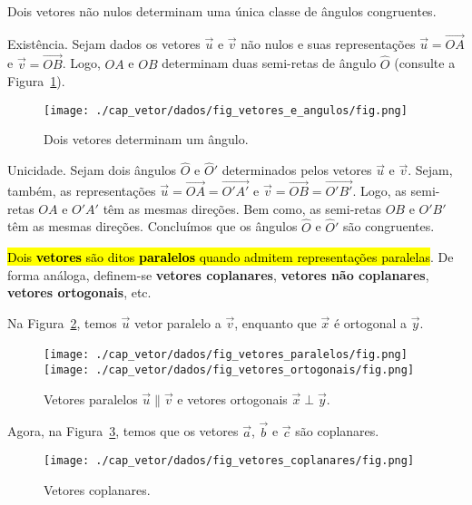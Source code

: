\begin{proposicao}
  Dois vetores não nulos determinam uma única classe de ângulos congruentes.
\end{proposicao}
\begin{demonstracao}
  Existência. Sejam dados os vetores $\vec{u}$ e $\vec{v}$ não nulos e suas representações $\vec{u}=\overrightarrow{OA}$ e $\vec{v}=\overrightarrow{OB}$. Logo, $OA$ e $OB$ determinam duas semi-retas de ângulo $\hat{O}$ (consulte a Figura~\ref{cap_vetor_sec_vetor:fig:vetores_e_angulos}).

  \begin{figure}[h!]
    \centering
    \texttt{[image: ./cap\_vetor/dados/fig\_vetores\_e\_angulos/fig.png]}
    \caption{Dois vetores determinam um ângulo.}
    \label{cap_vetor_sec_vetor:fig:vetores_e_angulos}
  \end{figure}

  Unicidade. Sejam dois ângulos $\hat{O}$ e $\hat{O}'$ determinados pelos vetores $\vec{u}$ e $\vec{v}$. Sejam, também, as representações $\vec{u}=\overrightarrow{OA}=\overrightarrow{O'A'}$ e $\vec{v}=\overrightarrow{OB}=\overrightarrow{O'B'}$. Logo, as semi-retas $OA$ e $O'A'$ têm as mesmas direções. Bem como, as semi-retas $OB$ e $O'B'$ têm as mesmas direções. Concluímos que os ângulos $\hat{O}$ e $\hat{O}'$ são congruentes.
\end{demonstracao}

\hl{Dois \textbf{vetores} são ditos \textbf{paralelos} quando admitem representações paralelas}. De forma análoga, definem-se \textbf{vetores coplanares}, \textbf{vetores não coplanares}, \textbf{vetores ortogonais}, etc.

\begin{ex}
  Na Figura~\ref{cap_vetor_sec_vetor:fig:vetores_pararel_perp}, temos $\vec{u}$ vetor paralelo a $\vec{v}$, enquanto que $\vec{x}$ é ortogonal a $\vec{y}$.

  \begin{figure}[h]
    \centering
    \texttt{[image: ./cap\_vetor/dados/fig\_vetores\_paralelos/fig.png]} ~
    \texttt{[image: ./cap\_vetor/dados/fig\_vetores\_ortogonais/fig.png]}
    \caption{Vetores paralelos $\vec{u}\parallel\vec{v}$ e vetores ortogonais $\vec{x}\perp\vec{y}$.}
    \label{cap_vetor_sec_vetor:fig:vetores_pararel_perp}
  \end{figure}

  Agora, na Figura~\ref{cap_vetor_sec_vetor:fig:vetores_coplanares}, temos que os vetores $\vec{a}$, $\vec{b}$ e $\vec{c}$ são coplanares.

  \begin{figure}[h]
    \centering
    \texttt{[image: ./cap\_vetor/dados/fig\_vetores\_coplanares/fig.png]}
    \caption{Vetores coplanares.}
    \label{cap_vetor_sec_vetor:fig:vetores_coplanares}
  \end{figure}
  
\end{ex}


